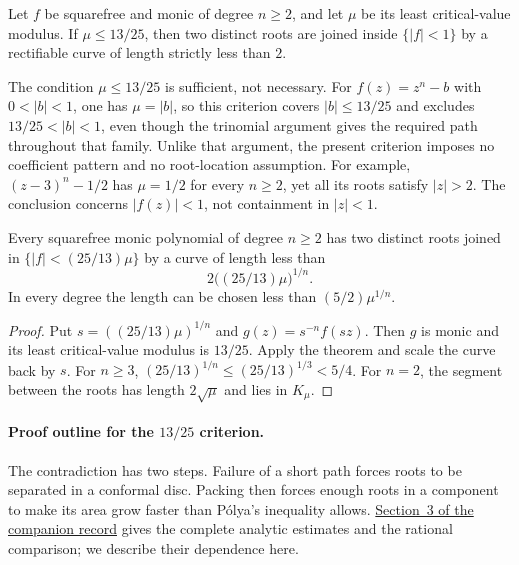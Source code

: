 \documentclass[11pt]{article}
\begin{document}
\begin{theorem}
\label{res:low-critical-thirteen-twentyfifths}
Let $f$ be squarefree and monic of degree $n\ge2$, and let $\mu$ be its least
critical-value modulus.  If $\mu\le13/25$, then two distinct roots are joined
inside $\{|f|<1\}$ by a rectifiable curve of length strictly less than $2$.
\end{theorem}

The condition $\mu\le13/25$ is sufficient, not necessary. For
$f(z)=z^n-b$ with $0<|b|<1$, one has $\mu=|b|$, so this criterion covers
$|b|\le13/25$ and excludes $13/25<|b|<1$, even though the trinomial
argument gives the required path throughout that family. Unlike that
argument, the present criterion imposes no coefficient pattern and no
root-location assumption. For example, $(z-3)^n-1/2$ has $\mu=1/2$
for every $n\ge2$, yet all its roots satisfy $|z|>2$. The conclusion
concerns $|f(z)|<1$, not containment in $|z|<1$.

\begin{corollary}
\label{res:scaled-low-critical}
Every squarefree monic polynomial of degree $n\ge2$ has two distinct roots
joined in $\{|f|<(25/13)\mu\}$ by a curve of length less than
\[
 2\bigl((25/13)\mu\bigr)^{1/n}.
\]
In every degree the length can be chosen less than $(5/2)\mu^{1/n}$.
\end{corollary}

\begin{proof}
Put $s=((25/13)\mu)^{1/n}$ and $g(z)=s^{-n}f(sz)$.  Then $g$ is monic and
its least critical-value modulus is $13/25$.  Apply the theorem and scale the
curve back by $s$.  For $n\ge3$,
$(25/13)^{1/n}\le(25/13)^{1/3}<5/4$.  For $n=2$, the segment between the
roots has length $2\sqrt\mu$ and lies in $K_\mu$.
\end{proof}

\paragraph{Proof outline for the $13/25$ criterion.}
The contradiction has two steps. Failure of a short path forces roots
to be separated in a conformal disc. Packing then forces enough roots
in a component to make its area grow faster than P\'olya's inequality
allows. \href{erdos1041-lemniscate-reasoning-surface.pdf\#section.3}{Section~3 of the companion record} gives the complete analytic
estimates and the rational comparison; we describe their dependence here.
\end{document}
